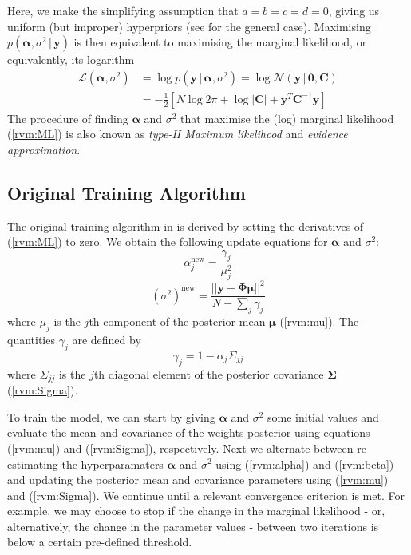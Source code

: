 Here, we make the simplifying assumption that $a=b=c=d=0$, giving us uniform (but improper) hyperpriors (see \cite{tipping2001} for the general case).
Maximising $p(\bm\alpha,\sigma^2\,|\,\bm y)$ is then equivalent to maximising the marginal likelihood, or equivalently, its logarithm
\begin{equation}
  \label{rvm:ML}
  \begin{split}
    \mathcal{L}(\bm\alpha,\sigma^2) &= \log p(\bm y\,|\,\bm\alpha,\sigma^2) = \log \mathcal{N}(\bm y \,|\,\bm 0, \bm C)\\
    &=-\frac{1}{2}\left[N\log 2\pi + \log|\bm C| + \bm y^T\bm C^{-1} \bm y\right]
\end{split}    
\end{equation}
The procedure of finding $\bm\alpha$ and $\sigma^2$ that maximise the (log) marginal likelihood (\ref{rvm:ML}) is also known as \emph{type-II Maximum likelihood} and \emph{evidence approximation}.

\subsection{Original Training Algorithm}
\label{sect:rvm_orig}
The original training algorithm in \cite{tipping2001} is derived by setting the derivatives of (\ref{rvm:ML}) to zero.
We obtain the following update equations for $\bm\alpha$ and $\sigma^2$:
\begin{equation}
  \label{rvm:alpha}
  \alpha_j^{\mbox{new}} = \frac{\gamma_j}{\mu_j^2}
\end{equation}
\begin{equation}
  \label{rvm:beta}
  (\sigma^2)^{\mbox{new}} = \frac{||\bm y - \bm\Phi\bm\mu||^2}{N - \sum_j\gamma_j}
\end{equation}
where $\mu_j$ is the $j$th component of the posterior mean $\bm\mu$ (\ref{rvm:mu}).
The quantities $\gamma_j$ are defined by 
\begin{equation*}
  \gamma_j = 1 - \alpha_j \Sigma_{jj}
\end{equation*}
where $\Sigma_{jj}$ is the $j$th diagonal element of the posterior covariance $\bm\Sigma$ (\ref{rvm:Sigma}).

To train the model, we can start by giving $\bm\alpha$ and $\sigma^2$ some initial values and evaluate the mean and covariance of the weights posterior using equations (\ref{rvm:mu}) and (\ref{rvm:Sigma}), respectively.
Next we alternate between re-estimating the hyperparamaters $\bm\alpha$ and $\sigma^2$ using (\ref{rvm:alpha}) and (\ref{rvm:beta}) and updating the posterior mean and covariance parameters using (\ref{rvm:mu}) and (\ref{rvm:Sigma}).
We continue until a relevant convergence criterion is met.
For example, we may choose to stop if the change in the marginal likelihood - or, alternatively, the change in the parameter values - between two iterations is below a certain pre-defined threshold.

